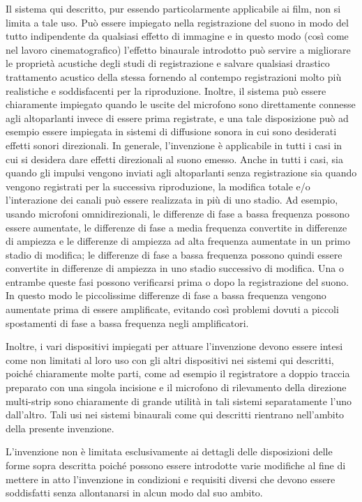 \documentclass[11pt]{article}
\begin{document}
\begin{multicols*}{2}
Il sistema qui descritto, pur essendo particolarmente applicabile ai film, non si limita a tale uso. Può essere impiegato nella registrazione del suono in modo del tutto indipendente da qualsiasi effetto di immagine e in questo modo (così come nel lavoro cinematografico) l'effetto binaurale introdotto può servire a migliorare le proprietà acustiche degli studi di registrazione e salvare qualsiasi drastico trattamento acustico della stessa fornendo al contempo registrazioni molto più realistiche e soddisfacenti per la riproduzione. Inoltre, il sistema può essere chiaramente impiegato quando le uscite del microfono sono direttamente connesse agli altoparlanti invece di essere prima registrate, e una tale disposizione può ad esempio essere impiegata in sistemi di diffusione sonora in cui sono desiderati effetti sonori direzionali. In generale, l'invenzione è applicabile in tutti i casi in cui si desidera dare effetti direzionali al suono emesso. Anche in tutti i casi, sia quando gli impulsi vengono inviati agli altoparlanti senza registrazione sia quando vengono registrati per la successiva riproduzione, la modifica totale e/o l'interazione dei canali può essere realizzata in più di uno stadio. Ad esempio, usando microfoni omnidirezionali, le differenze di fase a bassa frequenza possono essere aumentate, le differenze di fase a media frequenza convertite in differenze di ampiezza e le differenze di ampiezza ad alta frequenza aumentate in un primo stadio di modifica; le differenze di fase a bassa frequenza possono quindi essere convertite in differenze di ampiezza in uno stadio successivo di modifica. Una o entrambe queste fasi possono verificarsi prima o dopo la registrazione del suono. In questo modo le piccolissime differenze di fase a bassa frequenza vengono aumentate prima di essere amplificate, evitando così problemi dovuti a piccoli spostamenti di fase a bassa frequenza negli amplificatori.

Inoltre, i vari dispositivi impiegati per attuare l'invenzione devono essere intesi come non limitati al loro uso con gli altri dispositivi nei sistemi qui descritti, poiché chiaramente molte parti, come ad esempio il registratore a doppio traccia preparato con una singola incisione e il microfono di rilevamento della direzione multi-strip sono chiaramente di grande utilità in tali sistemi separatamente l'uno dall'altro. Tali usi nei sistemi binaurali come qui descritti rientrano nell'ambito della presente invenzione.

L'invenzione non è limitata esclusivamente ai dettagli delle disposizioni delle forme sopra descritta poiché possono essere introdotte varie modifiche al fine di mettere in atto l'invenzione in condizioni e requisiti diversi che devono essere soddisfatti senza allontanarsi in alcun modo dal suo ambito.


\end{multicols*}
\end{document}

